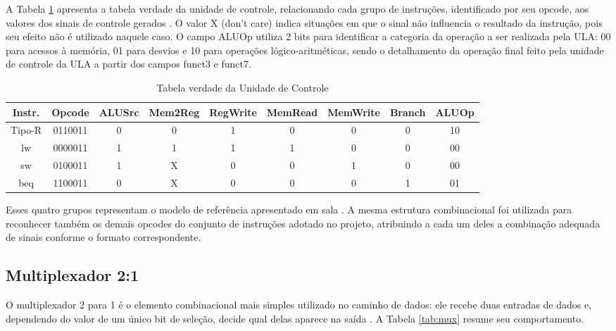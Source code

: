 \documentclass[conference]{IEEEtran}
\begin{document}
A Tabela \ref{tab:controle} apresenta a tabela verdade da unidade de controle, relacionando cada grupo de
instruções, identificado por seu opcode, aos valores dos sinais de controle gerados
\cite{patterson2020computer}. O valor X (don't care) indica situações em que o sinal não influencia o
resultado da instrução, pois seu efeito não é utilizado naquele caso. O campo ALUOp utiliza 2 bits para
identificar a categoria da operação a ser realizada pela ULA: 00 para acessos à memória, 01 para desvios e
10 para operações lógico-aritméticas, sendo o detalhamento da operação final feito pela unidade de
controle da ULA a partir dos campos funct3 e funct7.

\begin{table}[!t]
\caption{Tabela verdade da Unidade de Controle}
\begin{center}
\begin{tabular}{c|c|c|c|c|c|c|c|c}
\hline \hline
\textbf{Instr.} & \textbf{Opcode} & \textbf{ALUSrc} & \textbf{Mem2Reg} & \textbf{RegWrite} & \textbf{MemRead} & \textbf{MemWrite} & \textbf{Branch} & \textbf{ALUOp} \\
\hline
Tipo-R & 0110011 & 0 & 0 & 1 & 0 & 0 & 0 & 10 \\
lw & 0000011 & 1 & 1 & 1 & 1 & 0 & 0 & 00 \\
sw & 0100011 & 1 & X & 0 & 0 & 1 & 0 & 00 \\
beq & 1100011 & 0 & X & 0 & 0 & 0 & 1 & 01 \\
\hline \hline
\end{tabular}
\end{center}
\label{tab:controle}
\end{table}

Esses quatro grupos representam o modelo de referência apresentado em sala \cite{patterson2020computer}. A
mesma estrutura combinacional foi utilizada para reconhecer também os demais opcodes do conjunto de
instruções adotado no projeto, atribuindo a cada um deles a combinação adequada de sinais conforme o
formato correspondente.

\subsection{Multiplexador 2:1}
O multiplexador 2 para 1 é o elemento combinacional mais simples utilizado no caminho de dados: ele recebe
duas entradas de dados e, dependendo do valor de um único bit de seleção, decide qual delas aparece na
saída \cite{patterson2020computer}. A Tabela \ref{tab:mux} resume seu comportamento.
\end{document}
